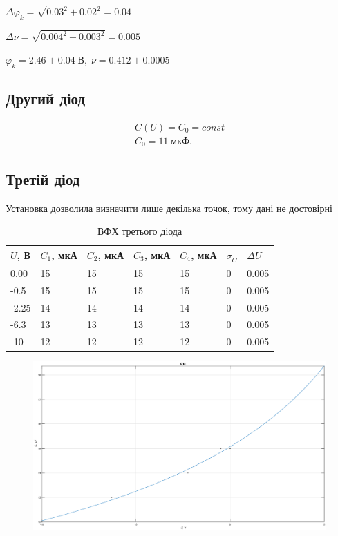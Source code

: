\documentclass[12pt]{article}
\begin{document}
$\Delta \varphi_k = \sqrt{0.03^{2} + 0.02^{2}} = 0.04$

$\Delta \nu = \sqrt{0.004^{2} + 0.003^{2}} = 0.005$

$\varphi_k = 2.46 \pm 0.04 \; \text{В}, \; \nu = 0.412 \pm 0.0005$


\subsection{Другий діод}
\begin{align*}
C(U) = C_0 = const\\
C_0 = 11 \; \text{мкФ}.
\end{align*}


\newpage
\subsection{Третій діод}
Установка дозволила визначити лише декілька точок, тому дані не достовірні

\begin{table}[h!]
	\centering
	\caption{ВФХ третього діода}
	\begin{tabular}{lllllll}
		\hline
        $U$, В & $C_1$, мкА & $C_2$, мкА & $C_3$, мкА & $C_4$, мкА & $\sigma_{\overline{C}}$  & $\Delta U$\\
		\hline
		0.00  & 15 & 15 & 15 & 15 & 0 & 0.005\\
		-0.5  & 15 & 15 & 15 & 15 & 0 & 0.005\\
		-2.25  & 14 & 14 & 14 & 14 & 0 & 0.005\\
		-6.3  & 13 & 13 & 13 & 13 & 0 & 0.005\\
		-10  & 12 & 12 & 12 & 12 & 0 & 0.005\\
		\hline
	\end{tabular}
\end{table}
\begin{figure}[!ht]
    \centering
    \includegraphics[scale=0.25]{vfc_2.eps}
\end{figure}
\end{document}
